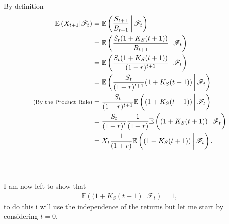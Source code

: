 \documentclass{beamer}
\numberwithin{equation}{section}
\begin{document}
\begin{frame}\frametitle{{\normalsize \secname} \\ {\large \subsecname}}
    By definition
    \begingroup
    \footnotesize
    \begin{align}
        \mathbb{E}\left(X_{t + 1} | \mathscr{F}_t\right) &= \mathbb{E}\left(\frac{S_{t + 1}}{B_{t + 1}} \, \bigg| \, \mathscr{F}_t\right) \\
        &= \mathbb{E}\left(\frac{S_{t}(1 + K_S(t + 1))}{B_{t + 1}} \, \bigg| \, \mathscr{F}_t\right) \\
        &= \mathbb{E}\left(\frac{S_{t}(1 + K_S(t + 1))}{(1 + r)^{t + 1}} \, \bigg| \, \mathscr{F}_t\right) \\
        &= \mathbb{E}\left(\frac{S_{t}}{(1 + r)^{t + 1}}(1 + K_S(t + 1)) \, \bigg| \, \mathscr{F}_t\right) \\
        \text{{\footnotesize (By the Product Rule)}} &= \frac{S_{t}}{(1 + r)^{t + 1}}\mathbb{E}\left((1 + K_S(t + 1)) \, \bigg| \, \mathscr{F}_t\right) \\
        &= \frac{S_{t}}{(1 + r)^{t}}\frac{1}{(1 + r)}\mathbb{E}\left((1 + K_S(t + 1)) \, \bigg| \, \mathscr{F}_t\right) \\
        &= X_t\frac{1}{(1 + r)}\mathbb{E}\left((1 + K_S(t + 1)) \, \bigg| \, \mathscr{F}_t\right).
    \end{align}
    \endgroup
\end{frame}

\begin{frame}\frametitle{{\normalsize \secname} \\ {\large \subsecname}}
    I am now left to show that
    \begin{align}
        \mathbb{E}\left((1 + K_S(t + 1) \, \bigg| \, \mathscr{F}_t\right) = 1,
    \end{align}
    to do this i will use the independence of the returns but let me start by considering $t = 0$.
\end{frame}
\end{document}
